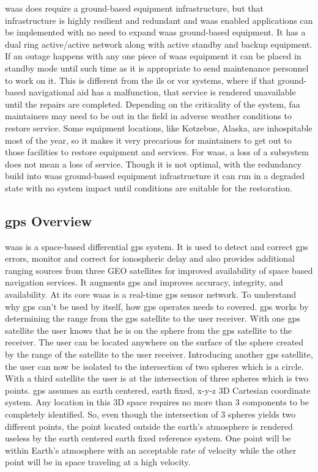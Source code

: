 \ac{waas} does require a ground-based equipment infrastructure, but that
infrastructure is highly resilient and redundant and \ac{waas} enabled
applications can be implemented with no need to expand \ac{waas}
ground-based equipment. It has a dual ring active/active network along
with active standby and backup equipment. If an outage happens with any
one piece of \ac{waas} equipment it can be placed in standby mode until such
time as it is appropriate to send maintenance personnel to work on it.
This is different from the \ac{ils} or \ac{vor}
systems, where if that ground-based navigational aid has a malfunction,
that service is rendered unavailable until the repairs are completed.
Depending on the criticality of the system, \ac{faa} maintainers may need to
be out in the field in adverse weather conditions to restore service.
Some equipment locations, like Kotzebue, Alaska, are inhospitable most
of the year, so it makes it very precarious for maintainers to get out
to those facilities to restore equipment and services. For \ac{waas}, a loss
of a subsystem does not mean a loss of service. Though it is not
optimal, with the redundancy build into \ac{waas} ground-based equipment
infrastructure it can run in a degraded state with no system impact
until conditions are suitable for the restoration.

\subsection{\ac{gps} Overview}\label{gps-overview}

\ac{waas} is a space-based differential \ac{gps} system. It is used to detect and
correct \ac{gps} errors, monitor and correct for ionospheric delay and also
provides additional ranging sources from three GEO satellites for
improved availability of space based navigation services. It augments
\ac{gps} and improves accuracy, integrity, and availability. At its core \ac{waas}
is a real-time \ac{gps} sensor network. To understand why \ac{gps} can't be used
by itself, how \ac{gps} operates needs to covered. \ac{gps} works by determining
the range from the \ac{gps} satellite to the user receiver. With one \ac{gps}
satellite the user knows that he is on the sphere from the \ac{gps} satellite
to the receiver. The user can be located anywhere on the surface of the
sphere created by the range of the satellite to the user receiver.
Introducing another \ac{gps} satellite, the user can now be isolated to the
intersection of two spheres which is a circle. With a third satellite
the user is at the intersection of three spheres which is two points.
\ac{gps} assumes an earth centered, earth fixed,
x-y-z 3D Cartesian coordinate system. Any location in this 3D space
requires no more than 3 components to be completely identified. So, even
though the intersection of 3 spheres yields two different points, the
point located outside the earth's atmosphere is rendered useless by the
earth centered earth fixed reference system. One point will be within
Earth's atmosphere with an acceptable rate of velocity while the other
point will be in space traveling at a high velocity.

